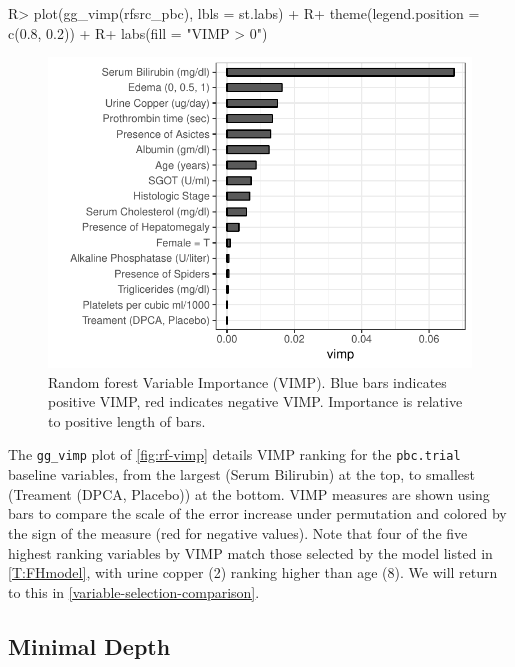 \documentclass[article, nojss]{jss}
\begin{document}
\begin{Schunk}
\begin{Sinput}
R> plot(gg_vimp(rfsrc_pbc), lbls = st.labs) +
R+   theme(legend.position = c(0.8, 0.2)) +
R+   labs(fill = "VIMP > 0")
\end{Sinput}
\begin{figure}[!htb]

{\centering \includegraphics{rfs-rf-vimp-1}

}

\caption[Random forest Variable Importance (VIMP)]{Random forest Variable Importance (VIMP). Blue bars indicates positive VIMP, red indicates negative VIMP. Importance is relative to positive length of bars.}\label{fig:rf-vimp}
\end{figure}
\end{Schunk}

The \texttt{gg\_vimp} plot of \autoref{fig:rf-vimp} details VIMP ranking
for the \texttt{pbc.trial} baseline variables, from the largest (Serum
Bilirubin) at the top, to smallest (Treament (DPCA, Placebo)) at the
bottom. VIMP measures are shown using bars to compare the scale of the
error increase under permutation and colored by the sign of the measure
(red for negative values). Note that four of the five highest ranking
variables by VIMP match those selected by the\citep{fleming:1991} model
listed in \autoref{T:FHmodel}, with urine copper (2) ranking higher than
age (8). We will return to this in
\autoref{variable-selection-comparison}.

\subsection{Minimal Depth}\label{minimal-depth}
\end{document}
